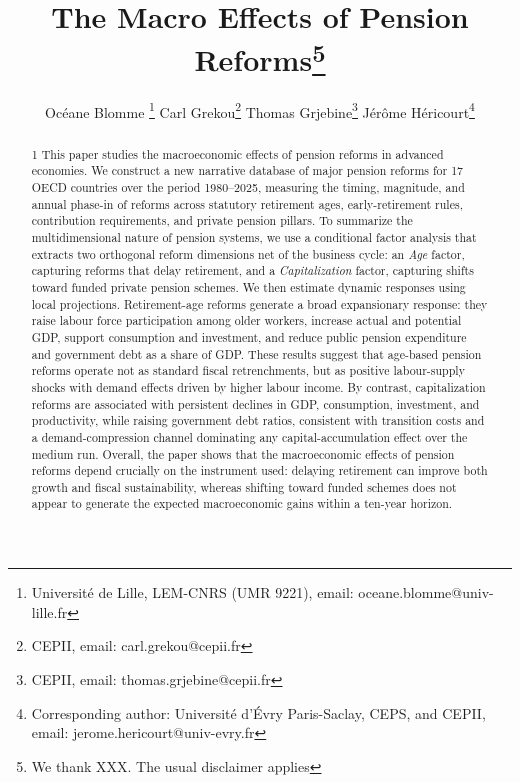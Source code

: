 \documentclass[11pt,english,a4paper, twoside, authoryear]{article}
\begin{document}
\baselineskip17pt

\title{\textbf{The Macro Effects of Pension Reforms}\thanks{We thank XXX. The usual disclaimer applies}}




\author{Océane Blomme \footnote{Universit\'{e} de Lille, LEM-CNRS (UMR 9221), email: oceane.blomme@univ-lille.fr} \quad Carl Grekou\footnote{CEPII, email: carl.grekou@cepii.fr} \quad Thomas Grjebine\footnote{CEPII, email: thomas.grjebine@cepii.fr} \quad Jérôme Héricourt\footnote{Corresponding author: Université d'Évry Paris-Saclay, CEPS, and CEPII, email: jerome.hericourt@univ-evry.fr}
}



\maketitle





\begin{abstract}
\begin{spacing}{1}
This paper studies the macroeconomic effects of pension reforms in advanced economies. We construct a new narrative database of major pension reforms for 17 OECD countries over the period 1980--2025, measuring the timing, magnitude, and annual phase-in of reforms across statutory retirement ages, early-retirement rules, contribution requirements, and private pension pillars. To summarize the multidimensional nature of pension systems, we use a conditional factor analysis that extracts two orthogonal reform dimensions net of the business cycle: an \emph{Age} factor, capturing reforms that delay retirement, and a \emph{Capitalization} factor, capturing shifts toward funded private pension schemes. We then estimate dynamic responses using local projections. Retirement-age reforms generate a broad expansionary response: they raise labour force participation among older workers, increase actual and potential GDP, support consumption and investment, and reduce public pension expenditure and government debt as a share of GDP. These results suggest that age-based pension reforms operate not as standard fiscal retrenchments, but as positive labour-supply shocks with demand effects driven by higher labour income. By contrast, capitalization reforms are associated with persistent declines in GDP, consumption, investment, and productivity, while raising government debt ratios, consistent with transition costs and a demand-compression channel dominating any capital-accumulation effect over the medium run. Overall, the paper shows that the macroeconomic effects of pension reforms depend crucially on the instrument used: delaying retirement can improve both growth and fiscal sustainability, whereas shifting toward funded schemes does not appear to generate the expected macroeconomic gains within a ten-year horizon.
\end{spacing}
\end{abstract}
\end{document}
